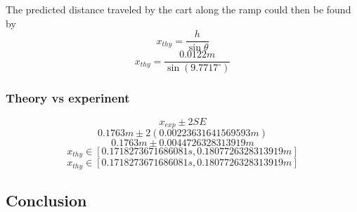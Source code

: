 \documentclass[11pt, letterpaper, includehead]{article}
\begin{document}
The predicted distance traveled by the cart along the ramp could then be
found by 
$$x_{thy} = \frac{h}{\sin \theta}$$
$$x_{thy} = \frac{0.0122m}{\sin(9.7717^{\circ})}$$

\subsubsection{Theory vs experinent}
$$x_{exp} \pm 2SE$$
$$0.1763m \pm 2(0.00223631641569593m)$$
$$0.1763m \pm 0.0044726328313919m$$
$$x_{thy}\in [0.1718273671686081 s, 0.1807726328313919m]$$
$$x_{thy}\in [0.1718273671686081 s, 0.1807726328313919m]$$

\subsection{Conclusion}
\end{document}
